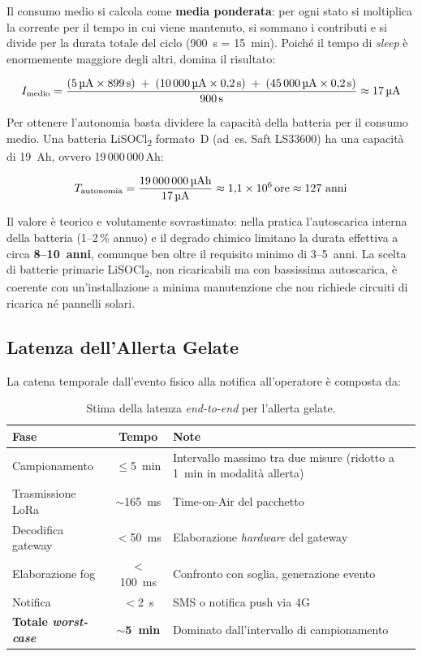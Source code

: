 \noindent Il consumo medio si calcola come \textbf{media ponderata}: per ogni stato si moltiplica la corrente per il tempo in cui viene mantenuto, si sommano i contributi e si divide per la durata totale del ciclo (900~s = 15~min). Poiché il tempo di \textit{sleep} è enormemente maggiore degli altri, domina il risultato:

\[
    I_{\text{medio}} = \frac{(5\,\text{\textmu A} \times 899\,\text{s}) \;+\; (10\,000\,\text{\textmu A} \times 0{,}2\,\text{s}) \;+\; (45\,000\,\text{\textmu A} \times 0{,}2\,\text{s})}{900\,\text{s}} \approx 17\,\text{\textmu A}
\]

\noindent Per ottenere l'autonomia basta dividere la capacità della batteria per il consumo medio. Una batteria LiSOCl\textsubscript{2} formato~D (ad~es. Saft LS33600) ha una capacità di 19~Ah, ovvero 19\,000\,000\,\textmu Ah:

\[
    T_{\text{autonomia}} = \frac{19\,000\,000\,\text{\textmu Ah}}{17\,\text{\textmu A}} \approx 1{,}1 \times 10^6 \text{\,ore} \approx 127~\text{anni}
\]

\noindent Il valore è teorico e volutamente sovrastimato: nella pratica l'autoscarica interna della batteria (1--2\,\% annuo) e il degrado chimico limitano la durata effettiva a circa \textbf{8--10~anni}, comunque ben oltre il requisito minimo di 3--5~anni. La scelta di batterie primarie LiSOCl\textsubscript{2}, non ricaricabili ma con bassissima autoscarica, è coerente con un'installazione a minima manutenzione che non richiede circuiti di ricarica né pannelli solari.

\subsection{Latenza dell'Allerta Gelate}

La catena temporale dall'evento fisico alla notifica all'operatore è composta da:

\begin{table}[H]
    \centering
    \small
    \begin{tabularx}{\textwidth}{|l|c|X|}
        \hline
        \textbf{Fase} & \textbf{Tempo} & \textbf{Note} \\
        \hline
        Campionamento & $\leq$5~min & Intervallo massimo tra due misure (ridotto a 1~min in modalità allerta) \\
        \hline
        Trasmissione LoRa & $\sim$165~ms & Time-on-Air del pacchetto \\
        \hline
        Decodifica gateway & $<$50~ms & Elaborazione \textit{hardware} del gateway \\
        \hline
        Elaborazione fog & $<$100~ms & Confronto con soglia, generazione evento \\
        \hline
        Notifica & $<$2~s & SMS o notifica push via 4G \\
        \hline
        \textbf{Totale \textit{worst-case}} & $\sim$\textbf{5~min} & Dominato dall'intervallo di campionamento \\
        \hline
    \end{tabularx}
    \caption{Stima della latenza \textit{end-to-end} per l'allerta gelate.}
    \label{tab:latenza_gelate}
\end{table}

